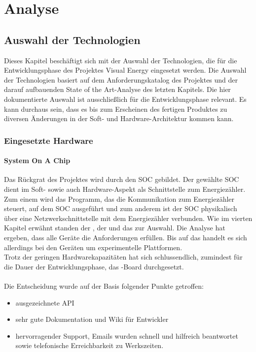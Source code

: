 \documentclass[Bachelorarbeit.tex]{subfiles}
\begin{document}
\chapter{Analyse}
\section{Auswahl der Technologien}
\label{sec:auswahl_technologien}
Dieses Kapitel beschäftigt sich mit der Auswahl der Technologien, die für die 
Entwicklungsphase des Projektes Visual Energy eingesetzt werden. Die Auswahl der 
Technologien basiert auf dem Anforderungskatalog des Projektes und der darauf 
aufbauenden State of the Art-Analyse des letzten Kapitels. Die hier dokumentierte 
Auswahl ist ausschließlich für die Entwicklungsphase relevant. Es kann durchaus sein, 
dass es bis zum Erscheinen des fertigen Produktes zu diversen Änderungen in der Soft- 
und Hardware-Architektur kommen kann.

\subsection{Eingesetzte Hardware}
\subsubsection*{System On A Chip}
Das Rückgrat des Projektes wird durch den \ac{SOC} gebildet. Der gewählte \ac{SOC} dient im 
Soft- sowie auch Hardware-Aspekt als Schnittstelle zum Energiezähler. Zum einem wird 
das Programm, das die Kommunikation zum Energiezähler steuert, auf dem \ac{SOC} 
ausgeführt und zum anderem ist der \ac{SOC} physikalisch über eine Netzwerkschnittstelle mit
dem Energiezähler verbunden. Wie im vierten Kapitel erwähnt standen der , der  und das  zur Auswahl. Die Analyse hat ergeben, dass alle Geräte die Anforderungen erfüllen. Bis auf das  handelt es sich allerdings bei den Geräten um experimentelle Plattformen. \\
Trotz der geringen Hardwarekapazitäten hat sich schlussendlich, zumindest für die Dauer 
der Entwicklungsphase, das -Board durchgesetzt. \\
\mbox{}\\
Die Entscheidung wurde auf der Basis folgender Punkte getroffen:
\begin{itemize}
\item ausgezeichnete API 
\item sehr gute Dokumentation und Wiki für Entwickler
\item hervorragender Support, Emails wurden schnell und hilfreich beantwortet sowie 
telefonische Erreichbarkeit zu Werkszeiten. 
\end{itemize}
\end{document}
